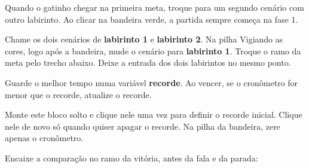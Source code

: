 \begin{solucao}
\begin{pilha}
\sbcend
\end{pilha}
\end{solucao}

\begin{exercicio}
Quando o gatinho chegar na primeira meta, troque para um segundo cenário com outro labirinto. Ao clicar na bandeira verde, a partida sempre começa na fase 1.
\end{exercicio}

\begin{solucao}
Chame os dois cenários de \textbf{labirinto 1} e \textbf{labirinto 2}. Na pilha Vigiando as cores, logo após a bandeira, mude o cenário para \textbf{labirinto 1}. Troque o ramo da meta pelo trecho abaixo. Deixe a entrada dos dois labirintos no mesmo ponto.
\begin{pilha}
\sbcend
\sbcend
\end{pilha}
\end{solucao}

\begin{desafio}
Guarde o melhor tempo numa variável \textbf{recorde}. Ao vencer, se o cronômetro for menor que o recorde, atualize o recorde.
\end{desafio}

\begin{solucao}
Monte este bloco solto e clique nele uma vez para definir o recorde inicial. Clique nele de novo só quando quiser apagar o recorde. Na pilha da bandeira, zere apenas o cronômetro.
\begin{pilha}
\end{pilha}
Encaixe a comparação no ramo da vitória, antes da fala e da parada:
\begin{pilha}
\sbcend
\end{pilha}
\end{solucao}
